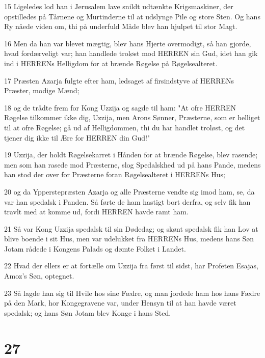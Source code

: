 \par 15 Ligeledes lod han i Jerusalem lave snildt udtænkte Krigsmaskiner, der opstilledes på Tårnene og Murtinderne til at udslynge Pile og store Sten. Og hans Ry nåede viden om, thi på underfuld Måde blev han hjulpet til stor Magt.
\par 16 Men da han var blevet mægtig, blev hans Hjerte overmodigt, så han gjorde, hvad fordærveligt var; han handlede troløst mod HERREN sin Gud, idet han gik ind i HERRENs Helligdom for at brænde Røgelse på Røgelsealteret.
\par 17 Præsten Azarja fulgte efter ham, ledsaget af firsindstyve af HERRENs Præster, modige Mænd;
\par 18 og de trådte frem for Kong Uzzija og sagde til ham: "At ofre HERREN Røgelse tilkommer ikke dig, Uzzija, men Arons Sønner, Præsterne, som er helliget til at ofre Røgelse; gå ud af Helligdommen, thi du har handlet troløst, og det tjener dig ikke til Ære for HERREN din Gud!"
\par 19 Uzzija, der holdt Røgelsekarret i Hånden for at brænde Røgelse, blev rasende; men som han rasede mod Præsterne, slog Spedalskhed ud på hans Pande, medens han stod der over for Præsterne foran Røgelsealteret i HERRENs Hus;
\par 20 og da Ypperstepræsten Azarja og alle Præsterne vendte sig imod ham, se, da var han spedalsk i Panden. Så førte de ham hastigt bort derfra, og selv fik han travlt med at komme ud, fordi HERREN havde ramt ham.
\par 21 Så var Kong Uzzija spedalsk til sin Dødedag; og skønt spedalsk fik han Lov at blive boende i sit Hus, men var udelukket fra HERRENs Hus, medens hans Søn Jotam rådede i Kongens Palads og dømte Folket i Landet.
\par 22 Hvad der ellers er at fortælle om Uzzija fra først til sidst, har Profeten Esajas, Amoz's Søn, optegnet.
\par 23 Så lagde han sig til Hvile hos sine Fædre, og man jordede ham hos hans Fædre på den Mark, hor Kongegravene var, under Hensyn til at han havde været spedalsk; og hans Søn Jotam blev Konge i hans Sted.

\chapter{27}

